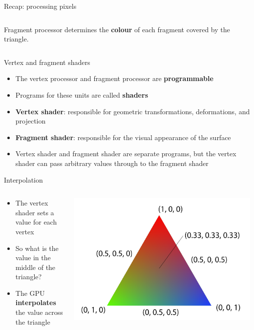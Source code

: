 \begin{frame}{Recap: processing pixels}
\begin{columns}
\begin{column}{0.5\textwidth}
\begin{center}
			\end{center}
			Fragment processor determines the \textbf{colour} of each fragment covered by the triangle.
		\end{column}
	\end{columns}
\end{frame}

\begin{frame}{Vertex and fragment shaders}
	\begin{itemize}
		\pause\item The vertex processor and fragment processor are \textbf{programmable}
		\pause\item Programs for these units are called \textbf{shaders}
		\pause\item \textbf{Vertex shader}: responsible for geometric transformations, deformations, and projection
		\pause\item \textbf{Fragment shader}: responsible for the visual appearance of the surface
		\pause\item Vertex shader and fragment shader are separate programs,
			but the vertex shader can pass arbitrary values through to the fragment shader
	\end{itemize}
\end{frame}

\begin{frame}{Interpolation}
	\begin{columns}
		\begin{column}{0.5\textwidth}
			\begin{itemize}
				\pause\item The vertex shader sets a value for each vertex
				\pause\item So what is the value in the middle of the triangle?
				\pause\item The GPU \textbf{interpolates} the value across the triangle
			\end{itemize}
		\end{column}
		\begin{column}{0.45\textwidth}
			\pause\includegraphics[width=\textwidth]{interpolation}
		\end{column}
	\end{columns}
\end{frame}